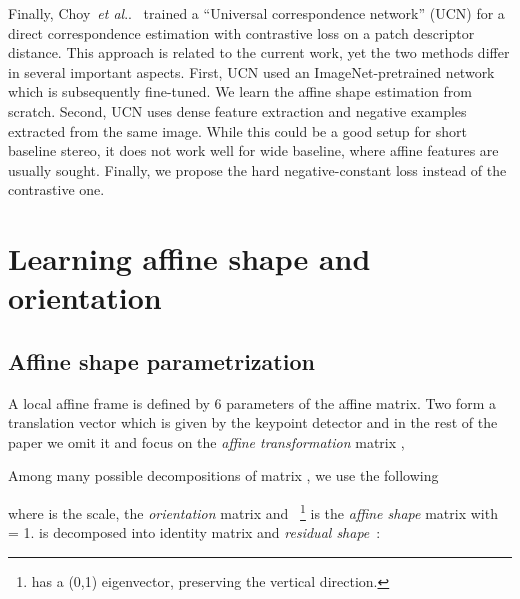 \documentclass[runningheads]{llncs}
\makeatletter
\DeclareRobustCommand\onedot{\futurelet\@let@token\@onedot}
\def\@onedot{\ifx\@let@token.\else.\null\fi\xspace}
\def\etal{\emph{et al}\onedot}
\makeatother
\begin{document}
Finally, Choy~\etal~\cite{UCN2016} trained a ``Universal correspondence network'' (UCN) for a direct correspondence estimation with contrastive loss on a patch descriptor distance. This approach is related to the current work, yet the two methods differ in several important aspects. First, UCN used an ImageNet-pretrained network which is subsequently fine-tuned. We learn the affine shape estimation from scratch. Second, UCN uses  dense feature extraction and negative examples extracted from the same image. While this could be a good setup for short baseline stereo, it does not work well for wide baseline, where affine features are usually sought. Finally, we propose the hard negative-constant loss instead of the contrastive one.   \section{Learning affine shape and orientation}\label{sec:main}
\subsection{Affine shape parametrization}A local affine frame is defined by 6 parameters of the affine matrix. Two form a translation vector  which is given by the keypoint detector and in the rest of the paper we omit it and focus on the \emph{affine transformation} matrix ,

Among many possible decompositions of matrix , we use the following  

where  is the scale,  the \emph{orientation} matrix and ~\footnote{ has a (0,1) eigenvector, preserving the vertical direction.} is the
\emph{affine shape} matrix with  = 1.
 is decomposed into identity matrix  and \emph{residual shape}~:
\end{document}
